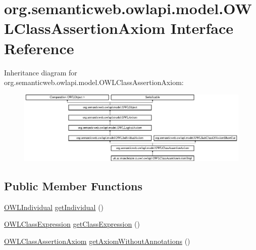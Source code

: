 \hypertarget{interfaceorg_1_1semanticweb_1_1owlapi_1_1model_1_1_o_w_l_class_assertion_axiom}{\section{org.\-semanticweb.\-owlapi.\-model.\-O\-W\-L\-Class\-Assertion\-Axiom Interface Reference}
\label{interfaceorg_1_1semanticweb_1_1owlapi_1_1model_1_1_o_w_l_class_assertion_axiom}
}
Inheritance diagram for org.\-semanticweb.\-owlapi.\-model.\-O\-W\-L\-Class\-Assertion\-Axiom\-:\begin{figure}[H]
\begin{center}
\leavevmode
\includegraphics[height=3.493761cm]{interfaceorg_1_1semanticweb_1_1owlapi_1_1model_1_1_o_w_l_class_assertion_axiom}
\end{center}
\end{figure}
\subsection*{Public Member Functions}
\begin{DoxyCompactItemize}
\item 
\hyperlink{interfaceorg_1_1semanticweb_1_1owlapi_1_1model_1_1_o_w_l_individual}{O\-W\-L\-Individual} \hyperlink{interfaceorg_1_1semanticweb_1_1owlapi_1_1model_1_1_o_w_l_class_assertion_axiom_a61b1fe712776fa619143cb8f83c2e18d}{get\-Individual} ()
\item 
\hyperlink{interfaceorg_1_1semanticweb_1_1owlapi_1_1model_1_1_o_w_l_class_expression}{O\-W\-L\-Class\-Expression} \hyperlink{interfaceorg_1_1semanticweb_1_1owlapi_1_1model_1_1_o_w_l_class_assertion_axiom_a82b1f864eea34809ff76a6a52c8fe935}{get\-Class\-Expression} ()
\item 
\hyperlink{interfaceorg_1_1semanticweb_1_1owlapi_1_1model_1_1_o_w_l_class_assertion_axiom}{O\-W\-L\-Class\-Assertion\-Axiom} \hyperlink{interfaceorg_1_1semanticweb_1_1owlapi_1_1model_1_1_o_w_l_class_assertion_axiom_a9efcd0ec7b62d5b8879b7c0f2c4ab56c}{get\-Axiom\-Without\-Annotations} ()
\end{DoxyCompactItemize}


